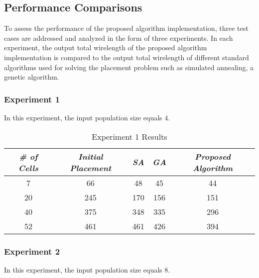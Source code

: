 \documentclass[conference]{IEEEtran}
\newcommand\T{\rule{0pt}{2.6ex}}       %
\newcommand\B{\rule[-1.2ex]{0pt}{0pt}} %
\begin{document}

\subsection{Performance Comparisons}

To assess the performance of the proposed algorithm implementation, three test cases are addressed and analyzed in the form of three experiments. In each experiment, the output total wirelength of the proposed algorithm implementation is compared to the output total wirelength of different standard algorithms used for solving the placement problem such as simulated annealing, a genetic algorithm.

\subsubsection{Experiment 1}

In this experiment, the input population size equals $4$.

\begin{table}[H]
    \caption{Experiment 1 Results}
    \centering
    \begin{tabular}{||c c c c c||}
        \hline
        \textit{\textbf{\# of Cells}} & \textit{\textbf{Initial Placement}} & \textit{\textbf{SA}} & \textit{\textbf{GA}} & \textit{\textbf{Proposed Algorithm}}\T \B \\
    \hline
    \hline
    7 & 66 & 48 & 45 & 44 \T \B\\ \hline
    20 & 245 & 170 & 156 & 151 \T \B\\ \hline
    40 & 375 & 348 & 335 & 296 \T \B\\ \hline
    52 & 461 & 461 & 426 & 394 \T \B\\ \hline
     \end{tabular}
    \label{table2}
\end{table}

\subsubsection{Experiment 2}

In this experiment, the input population size equals $8$.
\end{document}
